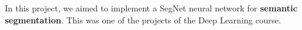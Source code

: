 \item{In this project, we aimed to implement a SegNet neural network for \textbf{semantic segmentation}. This was one of the projects of the Deep Learning course.}

